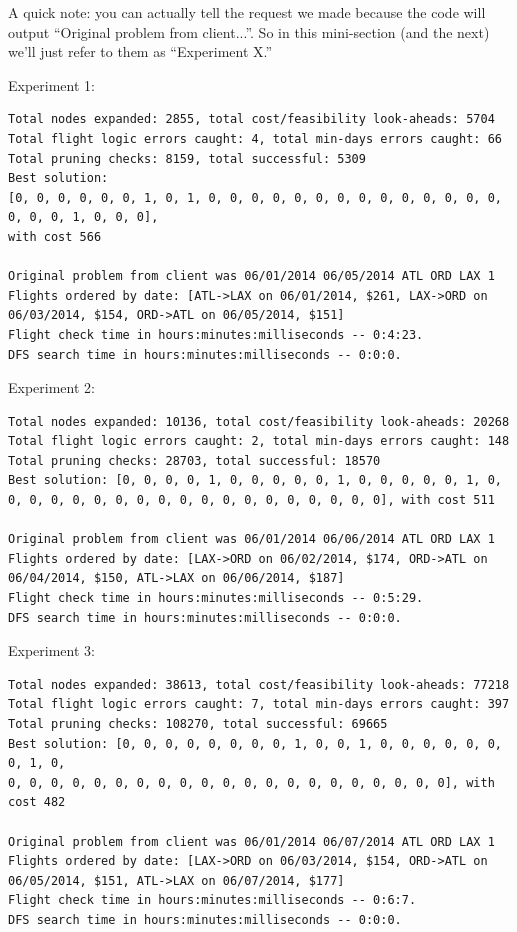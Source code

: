 \documentclass{article}
\begin{document}
A quick note: you can actually tell the request we made because the code will output ``Original problem from client...''. So in this mini-section (and
the next) we'll just refer to them as ``Experiment X.''

Experiment 1:

\scriptsize
\begin{verbatim}
Total nodes expanded: 2855, total cost/feasibility look-aheads: 5704
Total flight logic errors caught: 4, total min-days errors caught: 66
Total pruning checks: 8159, total successful: 5309
Best solution:
[0, 0, 0, 0, 0, 0, 1, 0, 1, 0, 0, 0, 0, 0, 0, 0, 0, 0, 0, 0, 0, 0, 0, 0, 0, 0, 1, 0, 0, 0],
with cost 566

Original problem from client was 06/01/2014 06/05/2014 ATL ORD LAX 1
Flights ordered by date: [ATL->LAX on 06/01/2014, $261, LAX->ORD on 06/03/2014, $154, ORD->ATL on 06/05/2014, $151]
Flight check time in hours:minutes:milliseconds -- 0:4:23.
DFS search time in hours:minutes:milliseconds -- 0:0:0.
\end{verbatim}
\normalsize

Experiment 2:

\scriptsize
\begin{verbatim}
Total nodes expanded: 10136, total cost/feasibility look-aheads: 20268
Total flight logic errors caught: 2, total min-days errors caught: 148
Total pruning checks: 28703, total successful: 18570
Best solution: [0, 0, 0, 0, 1, 0, 0, 0, 0, 0, 1, 0, 0, 0, 0, 0, 1, 0,
0, 0, 0, 0, 0, 0, 0, 0, 0, 0, 0, 0, 0, 0, 0, 0, 0, 0], with cost 511

Original problem from client was 06/01/2014 06/06/2014 ATL ORD LAX 1
Flights ordered by date: [LAX->ORD on 06/02/2014, $174, ORD->ATL on 06/04/2014, $150, ATL->LAX on 06/06/2014, $187]
Flight check time in hours:minutes:milliseconds -- 0:5:29.
DFS search time in hours:minutes:milliseconds -- 0:0:0.
\end{verbatim}
\normalsize

Experiment 3:

\scriptsize
\begin{verbatim}
Total nodes expanded: 38613, total cost/feasibility look-aheads: 77218
Total flight logic errors caught: 7, total min-days errors caught: 397
Total pruning checks: 108270, total successful: 69665
Best solution: [0, 0, 0, 0, 0, 0, 0, 0, 1, 0, 0, 1, 0, 0, 0, 0, 0, 0, 0, 1, 0,
0, 0, 0, 0, 0, 0, 0, 0, 0, 0, 0, 0, 0, 0, 0, 0, 0, 0, 0, 0, 0], with cost 482

Original problem from client was 06/01/2014 06/07/2014 ATL ORD LAX 1
Flights ordered by date: [LAX->ORD on 06/03/2014, $154, ORD->ATL on 06/05/2014, $151, ATL->LAX on 06/07/2014, $177]
Flight check time in hours:minutes:milliseconds -- 0:6:7.
DFS search time in hours:minutes:milliseconds -- 0:0:0.
\end{verbatim}
\normalsize
\end{document}
